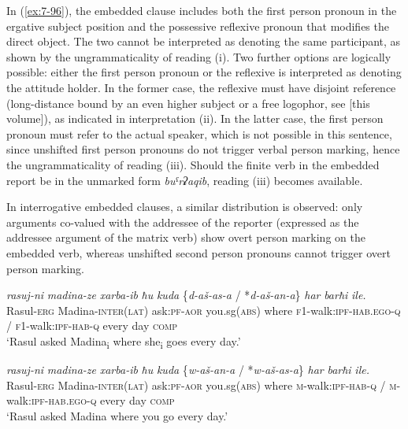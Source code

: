 ﻿\documentclass[output=paper]{langsci/langscibook}
\begin{document}
In (\ref{ex:7-96}), the embedded clause includes both the first person pronoun in
the ergative subject position and the possessive reflexive pronoun that
modifies the direct object. The two cannot be interpreted as denoting
the same participant, as shown by the ungrammaticality of reading (i).
Two further options are logically possible: either the first person
pronoun or the reflexive is interpreted as denoting the attitude holder.
In the former case, the reflexive must have disjoint reference
(long-distance bound by an even higher subject or a free logophor, see
\citealt{kozhukhar2019} [this volume]), as indicated in interpretation (ii).
In the latter case, the first person pronoun must refer to the actual
speaker, which is not possible in this sentence, since unshifted first
person pronouns do not trigger verbal person marking, hence the
ungrammaticality of reading (iii). Should the finite verb in the
embedded report be in the unmarked form \emph{buˤrʡaqib}, reading (iii)
becomes available.

In interrogative embedded clauses, a similar distribution is observed:
only arguments co-valued with the addressee of the reporter (expressed
as the addressee argument of the matrix verb) show overt person marking
on the embedded verb, whereas unshifted second person pronouns cannot
trigger overt person marking.

\ea %
\gll \emph{rasuj-ni} \emph{madina-ze} \emph{xarba-ib} \emph{ħu} \emph{kuda} \{\emph{d-aš-as-a} / *\emph{d-aš-an-a}\} \emph{har} \emph{barħi} \emph{ile.}\\
Rasul-\textsc{erg} Madina-\textsc{inter(lat)} ask:\textsc{pf}-\textsc{aor} you.sg(\textsc{abs}) where \textsc{f1}-walk:\textsc{ipf}-\textsc{hab}.\textsc{ego}-\textsc{q} / \textsc{f1}-walk:\textsc{ipf}-\textsc{hab}-\textsc{q} every day \textsc{comp}\\
\glt `Rasul asked Madina\textsubscript{i} where she\textsubscript{i} goes
every day.'

\ex \label{ex:7-98}
\gll \emph{rasuj-ni} \emph{madina-ze} \emph{xarba-ib} \emph{ħu} \emph{kuda} \{\emph{w-aš-an-a} / *\emph{w-aš-as-a}\} \emph{har} \emph{barħi} \emph{ile.}\\
Rasul-\textsc{erg} Madina-\textsc{inter(lat)} ask:\textsc{pf}-\textsc{aor} you.sg(\textsc{abs}) where \textsc{m}-walk:\textsc{ipf}-\textsc{hab}-\textsc{q} / \textsc{m}-walk:\textsc{ipf}-\textsc{hab}.\textsc{ego}-\textsc{q} every day \textsc{comp}\\
\glt `Rasul asked Madina where you go every day.'
\z
\end{document}
